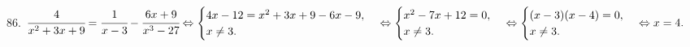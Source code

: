 86. $\cfrac{4}{x^2+3x+9}=\cfrac{1}{x-3}-\cfrac{6x+9}{x^3-27}\Leftrightarrow \begin{cases} 4x-12=x^2+3x+9-6x-9,\\ x\neq3.\end{cases}
\Leftrightarrow \begin{cases} x^2-7x+12=0,\\ x\neq3.\end{cases}\Leftrightarrow \begin{cases} (x-3)(x-4)=0,\\ x\neq3.\end{cases}\Leftrightarrow
x=4.$\\

